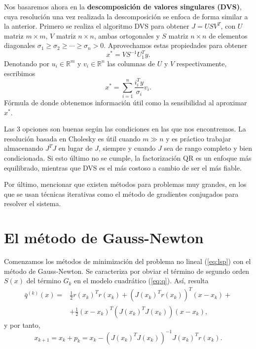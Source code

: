 \documentclass[11pt,a4paper]{book}
\theoremstyle{definition}
\theoremstyle{remark}
\begin{document}
Nos basaremos ahora en la \textbf{descomposición de valores singulares (DVS)}, cuya resolución una vez
realizada la descomposición se enfoca de forma similar a la anterior. Primero se realiza el algoritmo DVS
para obtener $J = USV^T$, con $U$ matriz $m \times m$, $V$ matriz $n \times n$, ambas ortogonales y $S$
matriz $n \times n$ de elementos diagonales $\sigma_1 \geq \sigma_2 \geq \cdots \geq \sigma_n > 0$.
Aprovechamos estas propiedades para obtener
\begin{equation}
	x^* = VS^{-1}U_1^Ty.
\end{equation}
Denotando por $u_i \in \mathbb{R}^m$ y $v_i \in \mathbb{R}^n$ las columnas de $U$ y $V$ respectivamente, escribimos
\begin{equation}
	x^* = \sum_{i=1}^n \frac{i_i^Ty}{\sigma_i}v_i.
\end{equation}
Fórmula de donde obtenemos información útil como la sensibilidad al aproximar $x^*$.

Las 3 opciones son buenas según las condiciones en las que nos encontremos. La resolución basada en Cholesky es útil cuando $m\gg n$ y es práctico trabajar almacenando $J^TJ$ en lugar de $J$, siempre y cuando $J$ sea de rango completo y bien condicionada. Si esto último no se cumple, la factorización QR es un enfoque más equilibrado, mientras que DVS es el más costoso a cambio de ser el más fiable.

Por último, mencionar que existen métodos para problemas muy grandes, en los que se usan técnicas iterativas como el método de gradientes conjugados para resolver el sistema.

\section{El método de Gauss-Newton}

Comenzamos los métodos de minimización del problema no lineal (\ref{eq:lsp}) con el método de Gauss-Newton. Se caracteriza por obviar el término de segundo orden $S(x)$ del término $G_k$ en el modelo cuadrático (\ref{eq:q}). Así, resulta
\begin{equation}
\begin{split}
\bar q^{(k)}(x) =& \frac{1}{2}r(x_k)^Tr(x_k)+(J(x_k)^Tr(x_k))^T(x-x_k)+ \\
	& +\frac{1}{2}(x-x_k)^T(J(x_k)^TJ(x_k))(x-x_k),
\end{split}
\end{equation}
y por tanto,
\begin{equation}
	x_{k+1} = x_k + p_k = x_k -(J(x_k)^TJ(x_k))^{-1}J(x_k)^Tr(x_k).
\end{equation}
\end{document}
